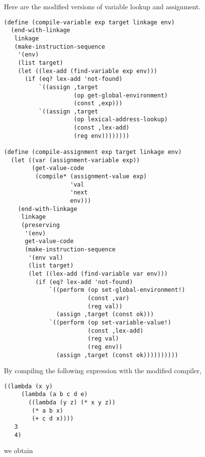 \documentclass[a4paper,12pt]{article}
\begin{document}
Here are the modified versions of variable lookup and assignment.

\begin{lstlisting}
(define (compile-variable exp target linkage env)
  (end-with-linkage
   linkage
   (make-instruction-sequence
    '(env)
    (list target)
    (let ((lex-add (find-variable exp env)))
      (if (eq? lex-add 'not-found)
          `((assign ,target
                    (op get-global-environment)
                    (const ,exp)))
          `((assign ,target
                    (op lexical-address-lookup)
                    (const ,lex-add)
                    (reg env))))))))

(define (compile-assignment exp target linkage env)
  (let ((var (assignment-variable exp))
        (get-value-code
         (compile* (assignment-value exp)
                   'val
                   'next
                   env)))
    (end-with-linkage
     linkage
     (preserving
      '(env)
      get-value-code
      (make-instruction-sequence
       '(env val)
       (list target)
       (let ((lex-add (find-variable var env)))
         (if (eq? lex-add 'not-found)
             `((perform (op set-global-environment!)
                        (const ,var)
                        (reg val))
               (assign ,target (const ok)))
             `((perform (op set-variable-value!)
                        (const ,lex-add)
                        (reg val)
                        (reg env))
               (assign ,target (const ok))))))))))
\end{lstlisting}

By compiling the following expression with the modified compiler,
\begin{lstlisting}
((lambda (x y)
     (lambda (a b c d e)
       ((lambda (y z) (* x y z))
        (* a b x)
        (+ c d x))))
   3
   4)
\end{lstlisting}

we obtain
\end{document}
